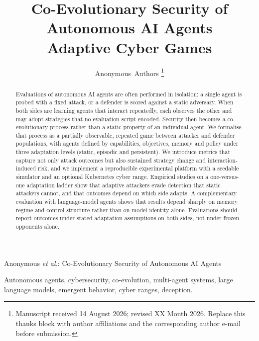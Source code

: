 \documentclass[journal]{IEEEtran}
\begin{document}
\title{Co-Evolutionary Security of Autonomous AI Agents\\
Adaptive Cyber Games}

\author{Anonymous~Authors%
\thanks{Manuscript received 14 August 2026; revised XX Month 2026.
Replace this thanks block with author affiliations and the corresponding
author e-mail before submission.}%
}

%
{Anonymous \MakeLowercase{\textit{et al.}}: Co-Evolutionary Security of Autonomous AI Agents}

\maketitle

\begin{abstract}
Evaluations of autonomous AI agents are often performed in isolation:
a single agent is probed with a fixed attack, or a defender is scored
against a static adversary. When both sides are learning agents that
interact repeatedly, each observes the other and may adopt strategies
that no evaluation script encoded. Security then becomes a
co-evolutionary process rather than a static property of an individual
agent. We formalise that process as a partially observable, repeated
game between attacker and defender populations, with agents defined by
capabilities, objectives, memory and policy under three adaptation
levels (static, episodic and persistent). We introduce metrics that
capture not only attack outcomes but also sustained strategy change and
interaction-induced risk, and we implement a reproducible experimental
platform with a seedable simulator and an optional Kubernetes cyber
range. Empirical studies on a one-versus-one adaptation ladder show
that adaptive attackers evade detection that static attackers cannot,
and that outcomes depend on which side adapts. A complementary evaluation
with language-model agents shows that results depend sharply on memory
regime and control structure rather than on model identity alone. Evaluations
should report outcomes under stated adaptation assumptions on both sides,
not under frozen opponents alone.
\end{abstract}

\begin{IEEEkeywords}
Autonomous agents, cybersecurity, co-evolution, multi-agent systems,
large language models, emergent behavior, cyber ranges, deception.
\end{IEEEkeywords}















\end{document}
